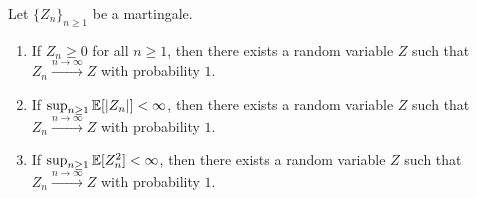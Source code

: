 \begin{theorem}
    Let $\{Z_{n}\}_{n \geq 1}$ be a martingale.
    \begin{enumerate}
        \item If $Z_{n} \geq 0$ for all $n \geq 1$, then there exists a random variable $Z$ such that $Z_{n} \xrightarrow{n \to \infty} Z$ with probability $1$.
        \item If $\sup_{n \geq 1} \mathbb{E}[\left| Z_{n} \right|] < \infty$, then there exists a random variable $Z$ such that $Z_{n} \xrightarrow{n \to \infty} Z$ with probability $1$.
        \item If $\sup_{n \geq 1} \mathbb{E}[Z_{n}^{2}] < \infty$, then there exists a random variable $Z$ such that $Z_{n} \xrightarrow{n \to \infty} Z$ with probability $1$.
    \end{enumerate}
\end{theorem}

